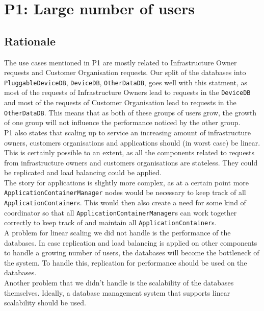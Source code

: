 \section{P1: Large number of users}

    \subsection*{Rationale}
        The use cases mentioned in P1 are mostly related to Infrastructure Owner requests and Customer Organisation requests.
        Our split of the databases into \texttt{PluggableDeviceDB}, \texttt{DeviceDB}, \texttt{OtherDataDB}, goes well with this statment,
        as most of the requests of Infrastructure Owners lead to requests in the \texttt{DeviceDB} and most of the requests of Customer Organisation
        lead to requests in the \texttt{OtherDataDB}. This means that as both of these groups of users grow, the growth of one group will not
        influence the performance noticed by the other group. \\

        P1 also states that scaling up to service an increasing amount of infrastructure owners, customers organisations
        and applications should (in worst case) be linear.
        This is certainly possible to an extent, as all the components related to requests from infrastructure
        owners and customers organisations are stateless. They could be replicated and load balancing could be applied. \\
        The story for applications is slightly more complex, as at a certain point more \texttt{ApplicationContainerManager} nodes
        would be necessary to keep track of all \texttt{ApplicationContainer}s. This would then also create a need for some
        kind of coordinator so that all \texttt{ApplicationContainerManager}s can work together correctly to keep track of and maintain
        all \texttt{ApplicationContainer}s. \\

        A problem for linear scaling we did not handle is the performance of the databases. In case replication and load
        balancing is applied on other components to handle a growing number of users,
        the databases will become the bottleneck of the system. To handle this, replication for performance should be used on the databases. \\

        Another problem that we didn't handle is the scalability of the databases themselves. Ideally, a database management system
        that supports linear scalability should be used.
